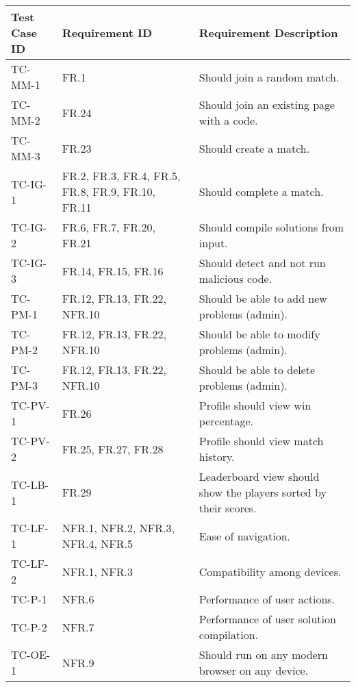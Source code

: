 \documentclass[12pt, titlepage]{article}
\begin{document}
\begin{longtable}{| p{2.5cm} | p{3cm} | p{8cm}| }
    \hline
    Test Case ID & Requirement ID & Requirement Description\\
    \hline
    TC-MM-1 & FR.1 & Should join a random match.\\
    \hline
    TC-MM-2 & FR.24 & Should join an existing page with a code. \\
     \hline
    TC-MM-3 & FR.23 & Should create a match. \\
     \hline
    TC-IG-1 & FR.2, FR.3, FR.4, FR.5, FR.8, FR.9, FR.10, FR.11 & Should complete a match. \\
     \hline
    TC-IG-2 & FR.6, FR.7, FR.20, FR.21 & Should compile solutions from input.\\
     \hline
    TC-IG-3 & FR.14, FR.15, FR.16   & Should detect and not run malicious code.\\
     \hline
    TC-PM-1 & FR.12, FR.13, FR.22, NFR.10 & Should be able to add new problems (admin).\\
     \hline
    TC-PM-2 & FR.12, FR.13, FR.22, NFR.10 & Should be able to modify problems (admin).\\
     \hline
    TC-PM-3 & FR.12, FR.13, FR.22, NFR.10 & Should be able to delete problems (admin).\\
     \hline
    TC-PV-1 & FR.26 & Profile should view win percentage.\\
     \hline
    TC-PV-2 & FR.25, FR.27, FR.28  & Profile should view match history.\\
     \hline
    TC-LB-1 & FR.29 & Leaderboard view should show the players sorted by their scores.\\
     \hline
    TC-LF-1 & NFR.1, NFR.2, NFR.3, NFR.4, NFR.5 & Ease of navigation.\\
    \hline
    TC-LF-2 & NFR.1, NFR.3  & Compatibility among devices.\\
    \hline
     TC-P-1 & NFR.6 & Performance of user actions.\\
    \hline
    TC-P-2 & NFR.7 & Performance of user solution compilation.\\
     \hline
    TC-OE-1 & NFR.9 & Should run on any modern browser on any device. \\

\end{longtable}
\end{document}
